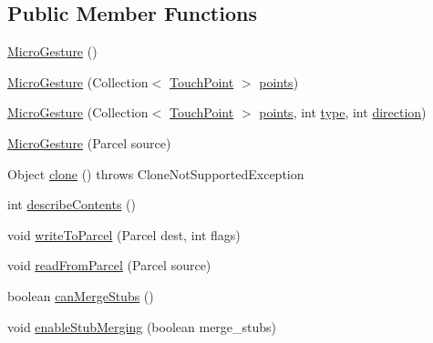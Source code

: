 \subsection*{Public Member Functions}
\begin{DoxyCompactItemize}
\item 
\hyperlink{classch_1_1zhaw_1_1ba10__bsha__1_1_1service_1_1MicroGesture_a751ff230434387aa91538c649520745b}{MicroGesture} ()
\item 
\hyperlink{classch_1_1zhaw_1_1ba10__bsha__1_1_1service_1_1MicroGesture_aef999428ccd948a1f401fff6b3787735}{MicroGesture} (Collection$<$ \hyperlink{classch_1_1zhaw_1_1ba10__bsha__1_1_1TouchPoint}{TouchPoint} $>$ \hyperlink{classch_1_1zhaw_1_1ba10__bsha__1_1_1service_1_1MicroGesture_a3eb0c61e8503400680d21d305ca58356}{points})
\item 
\hyperlink{classch_1_1zhaw_1_1ba10__bsha__1_1_1service_1_1MicroGesture_a96957bab62119263b061869d4caf6d18}{MicroGesture} (Collection$<$ \hyperlink{classch_1_1zhaw_1_1ba10__bsha__1_1_1TouchPoint}{TouchPoint} $>$ \hyperlink{classch_1_1zhaw_1_1ba10__bsha__1_1_1service_1_1MicroGesture_a3eb0c61e8503400680d21d305ca58356}{points}, int \hyperlink{classch_1_1zhaw_1_1ba10__bsha__1_1_1service_1_1MicroGesture_ac1ee8b835a0b20d0e3535682eb0d2741}{type}, int \hyperlink{classch_1_1zhaw_1_1ba10__bsha__1_1_1service_1_1MicroGesture_af599becac7054d4356b17da8eee187b0}{direction})
\item 
\hyperlink{classch_1_1zhaw_1_1ba10__bsha__1_1_1service_1_1MicroGesture_a915edd1a693527b48678802234a9d37d}{MicroGesture} (Parcel source)
\item 
Object \hyperlink{classch_1_1zhaw_1_1ba10__bsha__1_1_1service_1_1MicroGesture_a8fcc5afd682a4e6f39d6a813903e483f}{clone} ()  throws CloneNotSupportedException 
\item 
int \hyperlink{classch_1_1zhaw_1_1ba10__bsha__1_1_1service_1_1MicroGesture_a907d378703ba728992346b911b127339}{describeContents} ()
\item 
void \hyperlink{classch_1_1zhaw_1_1ba10__bsha__1_1_1service_1_1MicroGesture_ad934b5c1c2c627ea41d1a4d81d30e448}{writeToParcel} (Parcel dest, int flags)
\item 
void \hyperlink{classch_1_1zhaw_1_1ba10__bsha__1_1_1service_1_1MicroGesture_ad3f092e31d34245e598866b7e11e8d42}{readFromParcel} (Parcel source)
\item 
boolean \hyperlink{classch_1_1zhaw_1_1ba10__bsha__1_1_1service_1_1MicroGesture_af67a2c2d66724e55b7b3af29e220b91c}{canMergeStubs} ()
\item 
void \hyperlink{classch_1_1zhaw_1_1ba10__bsha__1_1_1service_1_1MicroGesture_ad5c219a463ce524eb0778e71717e7938}{enableStubMerging} (boolean merge\_\-stubs)

\end{DoxyCompactItemize}
